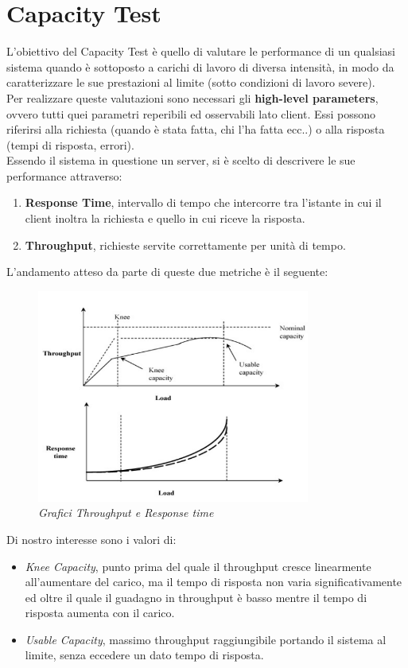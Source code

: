 \chapter{Capacity Test}
L'obiettivo del Capacity Test è quello di valutare le performance di un qualsiasi sistema quando è sottoposto a carichi di lavoro di diversa intensità, in modo da caratterizzare le sue prestazioni al limite (sotto condizioni di lavoro severe).
\\
Per realizzare queste valutazioni sono necessari gli \textbf{high-level parameters}, ovvero tutti quei parametri reperibili ed osservabili lato client. Essi possono riferirsi alla richiesta (quando è stata fatta, chi l'ha fatta ecc..) o alla risposta (tempi di risposta, errori).
\\
Essendo il sistema in questione un server, si è scelto di descrivere le sue performance attraverso:
\begin{enumerate}
	\item \textbf{Response Time}, intervallo di tempo che intercorre tra l'istante in cui il client inoltra la richiesta e quello in cui riceve la risposta.
	\item \textbf{Throughput}, richieste servite correttamente per unità di tempo.
\end{enumerate}
L'andamento atteso da parte di queste due metriche è il seguente:
\begin{figure}[H]
	\centering
	\includegraphics[width=0.8\textwidth]{img/hw2/Thr_resp.png}
	\caption{\textit{Grafici Throughput e Response time}}
\end{figure}
Di nostro interesse sono i valori di:
\begin{itemize}
	\item \textit{Knee Capacity}, punto prima del quale il throughput cresce linearmente all'aumentare del carico, ma il tempo di risposta non varia significativamente ed oltre il quale il guadagno in throughput è basso mentre il tempo di risposta aumenta con il carico.
	\item \textit{Usable Capacity}, massimo throughput raggiungibile portando il sistema al limite, senza eccedere un dato tempo di risposta.
\end{itemize}
